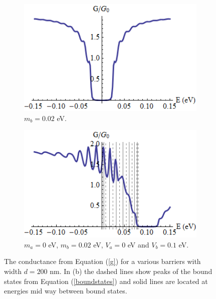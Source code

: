 \documentclass[12pt,a4paper]{report}
\begin{document}
\begin{figure}
	\begin{subfigure}{0.45\textwidth}
		\centerline{\includegraphics[scale=0.6]{images/rectangular-barrier-conductance-c}}
		\caption{$m_{b}=0.02$ eV.}
	\end{subfigure}
	\hspace{1.2cm}
	\begin{subfigure}{0.45\textwidth}
		\centerline{\includegraphics[scale=0.6]{images/rectangular-barrier-conductance-max}}
		\caption{$m_{a}=0$ eV, $m_{b}=0.02$ eV, $V_{a}=0$ eV and $V_{b}=0.1$ eV.}
		\label{conductance-max}
	\end{subfigure}
	\caption{The conductance from Equation (\ref{g}) for a various barriers with width $d=200$ nm. In (b) the dashed lines show peaks of the bound states from Equation (\ref{boundstates}) and solid lines are located at energies mid way between bound states.}
	\label{rectangular-barrier-conductance-c}
\end{figure}
\end{document}
